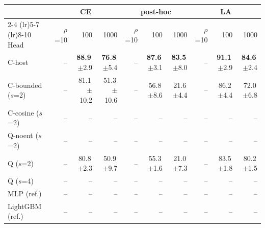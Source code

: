 \begin{tabular}{lrrrrrrrrr}
\toprule
 & \multicolumn{3}{c}{CE} & \multicolumn{3}{c}{post-hoc} & \multicolumn{3}{c}{LA} \\
\cmidrule(lr){2-4} \cmidrule(lr){5-7} \cmidrule(lr){8-10}
Head & $\rho$=10 & 100 & 1000 & $\rho$=10 & 100 & 1000 & $\rho$=10 & 100 & 1000 \\
\midrule
C-host & -- & \textbf{88.9}\,{\scriptsize$\pm$2.9} & \textbf{76.8}\,{\scriptsize$\pm$5.4} & -- & \textbf{87.6}\,{\scriptsize$\pm$3.1} & \textbf{83.5}\,{\scriptsize$\pm$8.0} & -- & \textbf{91.1}\,{\scriptsize$\pm$2.9} & \textbf{84.6}\,{\scriptsize$\pm$2.4} \\
C-bounded ($s$=2) & -- & 81.1\,{\scriptsize$\pm$10.2} & 51.3\,{\scriptsize$\pm$10.6} & -- & 56.8\,{\scriptsize$\pm$8.6} & 21.6\,{\scriptsize$\pm$4.4} & -- & 86.2\,{\scriptsize$\pm$4.4} & 72.0\,{\scriptsize$\pm$6.8} \\
C-cosine ($s$=2) & -- & -- & -- & -- & -- & -- & -- & -- & -- \\
Q-noent ($s$=2) & -- & -- & -- & -- & -- & -- & -- & -- & -- \\
Q ($s$=2) & -- & 80.8\,{\scriptsize$\pm$2.3} & 50.9\,{\scriptsize$\pm$9.7} & -- & 55.3\,{\scriptsize$\pm$1.6} & 21.0\,{\scriptsize$\pm$7.3} & -- & 83.5\,{\scriptsize$\pm$1.8} & 80.2\,{\scriptsize$\pm$1.5} \\
Q ($s$=4) & -- & -- & -- & -- & -- & -- & -- & -- & -- \\
\midrule
MLP (ref.) & -- & -- & -- & -- & -- & -- & -- & -- & -- \\
LightGBM (ref.) & -- & -- & -- & -- & -- & -- & -- & -- & -- \\
\bottomrule
\end{tabular}